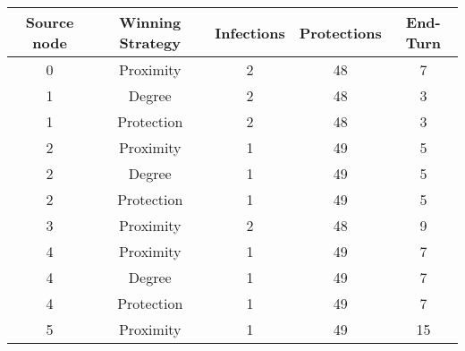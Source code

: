 \documentclass[results.tex]{subfiles}
\begin{document}
    \begin{center}
        \begin{tabular}{| c || c | c | c | c |}
            \hline
            {\bfseries Source node} & {\bfseries Winning Strategy} & {\bfseries Infections} & {\bfseries Protections}
            & {\bfseries End-Turn}
            \\  %
            \hline\hline
            0                       & Proximity                    & 2                      & 48                      & 7                    \\
            \hline
            1                       & Degree                       & 2                      & 48                      & 3                    \\
            \hline
            1                       & Protection                   & 2                      & 48                      & 3                    \\
            \hline
            2                       & Proximity                    & 1                      & 49                      & 5                    \\
            \hline
            2                       & Degree                       & 1                      & 49                      & 5                    \\
            \hline
            2                       & Protection                   & 1                      & 49                      & 5                    \\
            \hline
            3                       & Proximity                    & 2                      & 48                      & 9                    \\
            \hline
            4                       & Proximity                    & 1                      & 49                      & 7                    \\
            \hline
            4                       & Degree                       & 1                      & 49                      & 7                    \\
            \hline
            4                       & Protection                   & 1                      & 49                      & 7                    \\
            \hline
            5                       & Proximity                    & 1                      & 49                      & 15                   \\

\end{tabular}
\end{center}
\end{document}
